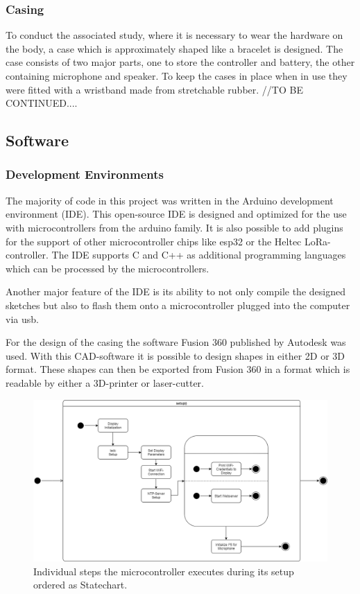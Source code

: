 \subsubsection{Casing}
To conduct the associated study, where it is necessary to wear the hardware on the body, a case which is approximately shaped like a bracelet is designed.
The case consists of two major parts, one to store the controller and battery, the other containing microphone and speaker.
To keep the cases in place when in use they were fitted with a wristband made from stretchable rubber.
//TO BE CONTINUED....

\subsection{Software}
\subsubsection{Development Environments}
The majority of code in this project was written in the Arduino development environment (IDE). 
This open-source IDE is designed and optimized for the use with microcontrollers from the arduino family.
It is also possible to add plugins for the support of other microcontroller chips like esp32 or the Heltec LoRa-controller.
The IDE supports C and C++ as additional programming languages which can be processed by the microcontrollers.

Another major feature of the IDE is its ability to not only compile the designed sketches but also to flash them onto a microcontroller plugged into the computer via usb.

For the design of the casing the software Fusion 360 published by Autodesk was used.
With this CAD-software it is possible to design shapes in either 2D or 3D format.
These shapes can then be exported from Fusion 360 in a format which is readable by either a 3D-printer or laser-cutter.
 

\begin{figure}[H]
	\includegraphics[width=\linewidth]{Media/Controller_setup.png}
	\caption{Individual steps the microcontroller executes during its setup ordered as Statechart.}
	\label{fig:cntrlr_stp}
\end{figure}

